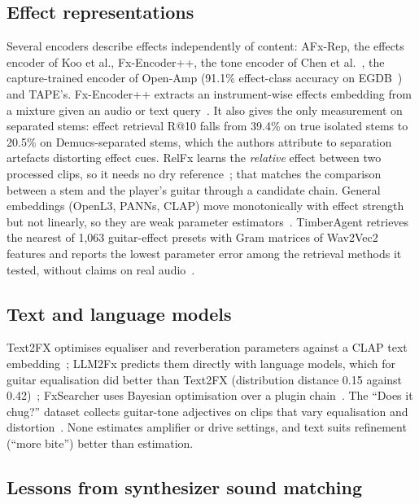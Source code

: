 \subsection{Effect representations}

Several encoders describe effects independently of content: AFx-Rep, the
effects encoder of Koo et al., Fx-Encoder++, the tone encoder of Chen et
al.~\cite{chen2024zeroshot}, the capture-trained encoder of Open-Amp
(91.1\% effect-class accuracy on EGDB~\cite{wright2025openamp}) and TAPE's.
Fx-Encoder++ extracts an instrument-wise effects embedding from a mixture
given an audio or text query~\cite{yeh2025fxencoder}. It also gives the only
measurement on separated stems: effect retrieval R@10 falls from 39.4\% on
true isolated stems to 20.5\% on Demucs-separated stems, which the authors
attribute to separation artefacts distorting effect cues. RelFx learns the
\emph{relative} effect between two processed clips, so it needs no dry
reference~\cite{liu2026beyond}; that matches the comparison between a stem and
the player's guitar through a candidate chain. General embeddings (OpenL3,
PANNs, CLAP) move monotonically with effect strength but not linearly, so they
are weak parameter estimators~\cite{deng2025investigating}. TimberAgent
retrieves the nearest of 1,063 guitar-effect presets with Gram matrices of
Wav2Vec2 features and reports the lowest parameter error among the retrieval
methods it tested, without claims on real audio~\cite{he2026timberagent}.

\subsection{Text and language models}

Text2FX optimises equaliser and reverberation parameters against a CLAP text
embedding~\cite{chu2025text2fx}; LLM2Fx predicts them directly with language
models, which for guitar equalisation did better than Text2FX
(distribution distance 0.15 against 0.42)~\cite{doh2025llm2fx}; FxSearcher uses
Bayesian optimisation over a plugin chain~\cite{ki2025fxsearcher}. The ``Does
it chug?'' dataset collects guitar-tone adjectives on clips that vary
equalisation and distortion~\cite{sutar2024chug}. None estimates amplifier or
drive settings, and text suits refinement (``more bite'') better than
estimation.

\subsection{Lessons from synthesizer sound matching}

